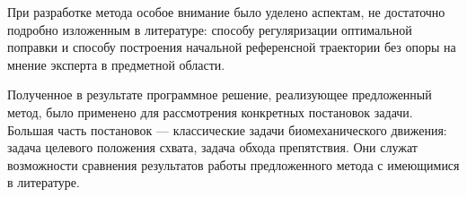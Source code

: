\documentclass[../doc.tex]{subfiles}
\begin{document}
    При разработке метода особое внимание было уделено аспектам, не достаточно подробно
        изложенным в литературе: способу регуляризации оптимальной поправки и способу
        построения начальной референсной траектории без опоры на мнение эксперта в предметной
        области.

    Полученное в результате программное решение, реализующее предложенный метод, 
        было применено для рассмотрения конкретных постановок задачи.
    Большая часть постановок --- классические задачи биомеханического движения: задача целевого положения схвата, задача обхода препятствия.
    Они служат возможности сравнения результатов работы предложенного метода с имеющимися в литературе.

    \ifSubfilesClassLoaded{
        \nocite{*}
        \clearpage
        
        
    }{}
\end{document}

